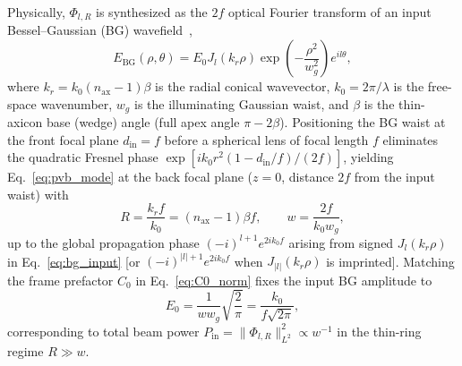 \documentclass[aps,pra,onecolumn,notitlepage,11pt,tightenlines,nofootinbib,floatfix,longbibliography]{revtex4-2}
\theoremstyle{remark}
\newcommand{\norm}[1]{\lVert #1 \rVert}
\newcommand{\abs}[1]{\lvert #1 \rvert}
\begin{document}
Physically, $\Phi_{l,R}$ is synthesized as the $2f$ optical Fourier transform of an input Bessel--Gaussian (BG) wavefield~\cite{Vaity2015,Gori1987},
\begin{equation}
E_{\mathrm{BG}}(\rho,\theta) = E_0 J_l(k_r\rho)\exp\!\left(-\frac{\rho^2}{w_g^2}\right) e^{il\theta},
\label{eq:bg_input}
\end{equation}
where $k_r = k_0 (n_{\mathrm{ax}} - 1)\beta$ is the radial conical wavevector, $k_0 = 2\pi/\lambda$ is the free-space wavenumber, $w_g$ is the illuminating Gaussian waist, and $\beta$ is the thin-axicon base (wedge) angle (full apex angle $\pi - 2\beta$). Positioning the BG waist at the front focal plane $d_{\mathrm{in}} = f$ before a spherical lens of focal length $f$ eliminates the quadratic Fresnel phase $\exp[ik_0 r^2(1 - d_{\mathrm{in}}/f)/(2f)]$, yielding Eq.~\eqref{eq:pvb_mode} at the back focal plane ($z = 0$, distance $2f$ from the input waist) with~\cite{Vaity2015}
\begin{equation}
R = \frac{k_r f}{k_0} = (n_{\mathrm{ax}} - 1)\beta f, \qquad w = \frac{2f}{k_0 w_g},
\label{eq:R_w_2f}
\end{equation}
up to the global propagation phase $(-i)^{l+1} e^{2ik_0 f}$ arising from signed $J_l(k_r\rho)$ in Eq.~\eqref{eq:bg_input} [or $(-i)^{\abs{l}+1} e^{2ik_0 f}$ when $J_{\abs{l}}(k_r\rho)$ is imprinted]. Matching the frame prefactor $C_0$ in Eq.~\eqref{eq:C0_norm} fixes the input BG amplitude to
\begin{equation}
E_0 = \frac{1}{w w_g}\sqrt{\frac{2}{\pi}} = \frac{k_0}{f\sqrt{2\pi}},
\label{eq:E0_bridge}
\end{equation}
corresponding to total beam power $P_{\mathrm{in}} = \norm{\Phi_{l,R}}_{L^2}^2 \propto w^{-1}$ in the thin-ring regime $R \gg w$.
\end{document}
